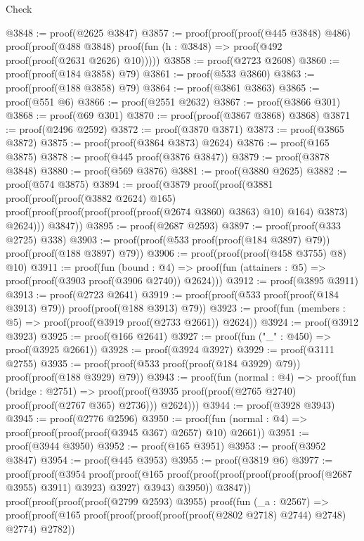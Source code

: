 \begin{lexlean}{Check}
\begin{coremodule}
@3848 := proof(@2625 @3847)
@3857 := proof(proof(proof(@445 @3848) @486)
      proof(proof(@488 @3848) proof(fun (h : @3848) => proof(@492 proof(proof(@2631 @2626) @10)))))
@3858 := proof(@2723 @2608)
@3860 := proof(proof(@184 @3858) @79)
@3861 := proof(@533 @3860)
@3863 := proof(proof(@188 @3858) @79)
@3864 := proof(@3861 @3863)
@3865 := proof(@551 @6)
@3866 := proof(@2551 @2632)
@3867 := proof(@3866 @301)
@3868 := proof(@69 @301)
@3870 := proof(proof(@3867 @3868) @3868)
@3871 := proof(@2496 @2592)
@3872 := proof(@3870 @3871)
@3873 := proof(@3865 @3872)
@3875 := proof(proof(@3864 @3873) @2624)
@3876 := proof(@165 @3875)
@3878 := proof(@445 proof(@3876 @3847))
@3879 := proof(@3878 @3848)
@3880 := proof(@569 @3876)
@3881 := proof(@3880 @2625)
@3882 := proof(@574 @3875)
@3894 := proof(@3879
      proof(proof(@3881
            proof(proof(proof(@3882 @2624) @165)
                proof(proof(proof(proof(proof(proof(@2674 @3860) @3863) @10) @164) @3873) @2624)))
          @3847))
@3895 := proof(@2687 @2593)
@3897 := proof(proof(@333 @2725) @338)
@3903 := proof(proof(@533 proof(proof(@184 @3897) @79)) proof(proof(@188 @3897) @79))
@3906 := proof(proof(proof(@458 @3755) @8) @10)
@3911 := proof(fun (bound : @4) =>
    proof(fun (attainers : @5) => proof(proof(@3903 proof(@3906 @2740)) @2624)))
@3912 := proof(@3895 @3911)
@3913 := proof(@2723 @2641)
@3919 := proof(proof(@533 proof(proof(@184 @3913) @79)) proof(proof(@188 @3913) @79))
@3923 := proof(fun (members : @5) => proof(proof(@3919 proof(@2733 @2661)) @2624))
@3924 := proof(@3912 @3923)
@3925 := proof(@166 @2641)
@3927 := proof(fun ("_" : @450) => proof(@3925 @2661))
@3928 := proof(@3924 @3927)
@3929 := proof(@3111 @2755)
@3935 := proof(proof(@533 proof(proof(@184 @3929) @79)) proof(proof(@188 @3929) @79))
@3943 := proof(fun (normal : @4) =>
    proof(fun (bridge : @2751) =>
      proof(proof(@3935 proof(proof(@2765 @2740) proof(proof(@2767 @365) @2736))) @2624)))
@3944 := proof(@3928 @3943)
@3945 := proof(@2776 @2596)
@3950 := proof(fun (normal : @4) => proof(proof(proof(proof(@3945 @367) @2657) @10) @2661))
@3951 := proof(@3944 @3950)
@3952 := proof(@165 @3951)
@3953 := proof(@3952 @3847)
@3954 := proof(@445 @3953)
@3955 := proof(@3819 @6)
@3977 := proof(proof(@3954
        proof(proof(@165
              proof(proof(proof(proof(proof(proof(@2687 @3955) @3911) @3923) @3927) @3943) @3950))
            @3847))
      proof(proof(proof(proof(@2799 @2593) @3955)
            proof(fun (_a : @2567) =>
              proof(proof(@165
                    proof(proof(proof(proof(proof(@2802 @2718) @2744) @2748) @2774) @2782))

\end{coremodule}
\end{lexlean}
